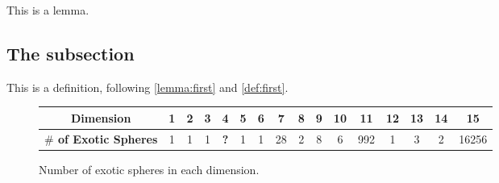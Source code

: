 \begin{lemma}\label{lemma:first}
	This is a lemma.
\end{lemma}

\subsection{The subsection}

\begin{definition}\label{def:second}
	This is a definition, following \cref{lemma:first} and \cref{def:first}.
\end{definition}

\begin{figure}\label{fig:exotic_spheres_table}
	\centering
	\begin{tabular}{|c|c|c|c|c|c|c|c|c|c|c|c|c|c|c|c|}
		\hline
		\textbf{Dimension}
		 & 1 & 2 & 3  & 4                      & 5  & 6  & 7
		 & 8 & 9 & 10 & 11                     & 12 & 13 & 14 & 15    \\
		\hline
		\textbf{$\#$ of Exotic Spheres}
		 & 1 & 1 & 1  & \textbf{\color{red} ?} & 1  & 1  & 28
		 & 2 & 8 & 6  & 992                    & 1  & 3  & 2  & 16256 \\
		\hline
	\end{tabular}
	\caption{Number of exotic spheres in each dimension.}
\end{figure}

\lipsum[3-6]
